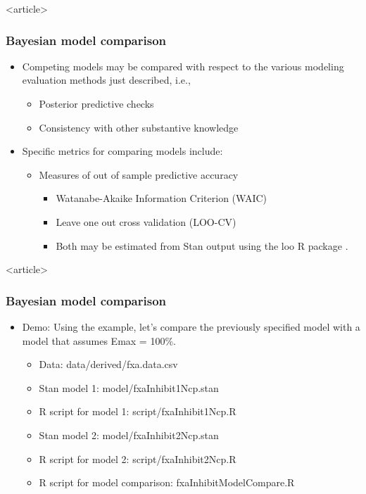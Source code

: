 \documentclass[handout]{beamer}
\begin{document}
\begin{frame}<article>
  \frametitle{Bayesian model comparison}
  
  \begin{itemize}
  \item Competing models may be compared with respect to the various
    modeling evaluation methods just described, i.e.,
    \begin{itemize}
    \item Posterior predictive checks
    \item Consistency with other substantive knowledge
    \end{itemize}
  \item Specific metrics for comparing models include:
    \begin{itemize}
    \item Measures of out of sample predictive accuracy \cite[Chapter 7]{gelman2014}
      \begin{itemize}
      \item Watanabe-Akaike Information Criterion (WAIC)
\item Leave one out cross validation (LOO-CV)
\item Both may be estimated from Stan output using the loo R package
  \cite{vehtari2015}.
      \end{itemize}
    \end{itemize}
  \end{itemize}

\end{frame}

\begin{frame}<article>
  \frametitle{Bayesian model comparison}
  
  \begin{itemize}
 \item Demo: Using the example, let's compare the
  previously specified model with a model that assumes Emax = 100\%.
  \begin{itemize}
    \item Data: data/derived/fxa.data.csv
  \item Stan model 1: model/fxaInhibit1Ncp.stan
  \item R script for model 1: script/fxaInhibit1Ncp.R
  \item Stan model 2: model/fxaInhibit2Ncp.stan
  \item R script for model 2: script/fxaInhibit2Ncp.R
\item R script for model comparison: fxaInhibitModelCompare.R
  \end{itemize}
  \end{itemize}

\end{frame}
\end{document}
